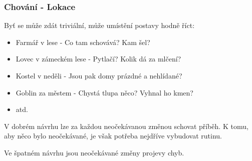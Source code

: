 ﻿\documentclass[a4paper]{beamer}
\def\uv#1{\char92\relax #1\char34\relax}
\begin{document}
\begin{frame}
\frametitle{Chování - Lokace}

Byť se může zdát triviální, může umístění postavy hodně říct:

 \begin{itemize}
     \item Farmář v lese - Co tam schovává? Kam šel?
     \item Lovec v zámeckém lese - Pytlačí? Kolik dá za mlčení?
     \item Kostel v neděli - Jsou pak domy prázdné a nehlídané?
     \item Goblin za městem - Chystá tlupa něco? Vyhnal ho kmen?      
     \item atd.
 \end{itemize}
 
 V dobrém návrhu lze za každou neočekávanou změnou \uv{schovat} příběh. 
 K tomu, aby něco bylo neočekávané, je však potřeba nejdříve vybudovat \uv{rutinu}. 
 
 \vfill
 Ve špatném návrhu jsou neočekávané změny projevy chyb. 



\end{frame}
\end{document}
